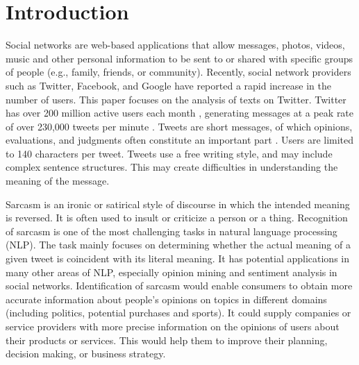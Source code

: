 \documentclass[english]{jnlp_1.4}
\begin{document}
\maketitle

\section{Introduction}
\label{ref:introduction}

Social networks are web-based applications that allow messages, photos, videos, music and other personal information to be sent to or shared with specific groups of people (e.g., family, friends, or community).
Recently, social network providers such as Twitter, Facebook, and Google have reported a rapid increase in the number of users.
This paper focuses on the analysis of texts on Twitter.
Twitter has over 200 million active users each month , generating messages at a peak rate of over 230,000 tweets per minute .
Tweets are short messages, of which opinions, evaluations, and judgments often constitute an important part . Users are limited to 140 characters per tweet.
Tweets use a free writing style, and may include complex sentence structures.
This may create difficulties in understanding the meaning of the message.

Sarcasm is an ironic or satirical style of discourse in which the intended meaning is reversed.
It is often used to insult or criticize a person or a thing.
Recognition of sarcasm is one of the most challenging tasks in natural language processing (NLP).
The task mainly focuses on determining whether the actual meaning of a given tweet is coincident with its literal meaning.
It has potential applications in many other areas of NLP, especially opinion mining and sentiment analysis in social networks.
Identification of sarcasm would enable consumers to obtain more accurate information about people's opinions on topics in different domains (including politics, potential purchases and sports).
It could supply companies or service providers with more precise information on the opinions of users about their products or services.
This would help them to improve their planning, decision making, or business strategy.
\end{document}
